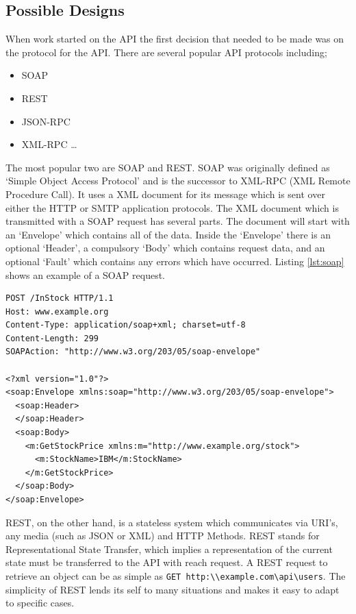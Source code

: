 \documentclass[11pt,a4paper]{report}
\begin{document}
\subsection{Possible Designs}
\label{sec:api:rejected-designs} %
When work started on the API the first decision that needed to be made was on the protocol for the API. There are several popular API protocols including;

\begin{itemize}
\item SOAP
\item REST
\item JSON-RPC 
\item XML-RPC \ldots
\end{itemize}

The most popular two are SOAP and REST. SOAP was originally defined as `Simple Object Access Protocol' and is the successor to XML-RPC (XML Remote Procedure Call). It uses a XML document for its message which is sent over either the HTTP or SMTP application protocols. The XML document which is transmitted with a SOAP request has several parts. The document will start with an `Envelope' which contains all of the data. Inside the `Envelope' there is an optional `Header', a compulsory `Body' which contains request data, and an optional `Fault' which contains any errors which have occurred. Listing \ref{lst:soap} shows an example of a SOAP request.


\begin{lstlisting}[captionpos=b, caption=An example SOAP request., label=lst:soap, frame=single]
POST /InStock HTTP/1.1
Host: www.example.org
Content-Type: application/soap+xml; charset=utf-8
Content-Length: 299
SOAPAction: "http://www.w3.org/203/05/soap-envelope"
 
<?xml version="1.0"?>
<soap:Envelope xmlns:soap="http://www.w3.org/203/05/soap-envelope">
  <soap:Header>
  </soap:Header>
  <soap:Body>
    <m:GetStockPrice xmlns:m="http://www.example.org/stock">
      <m:StockName>IBM</m:StockName>
    </m:GetStockPrice>
  </soap:Body>
</soap:Envelope>
\end{lstlisting}

REST, on the other hand, is a stateless system which communicates via URI's, any media (such as JSON or XML) and HTTP Methods. REST stands for Representational State Transfer, which implies a representation of the current state must be transferred to the API with reach request. A REST request to retrieve an object can be as simple as \lstinline$GET http:\\example.com\api\users$. The simplicity of REST lends its self to many situations and makes it easy to adapt to specific cases. 
\end{document}
